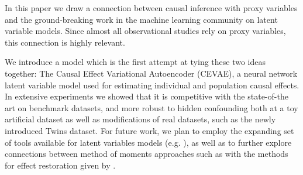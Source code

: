 \vskip -10pt
In this paper we draw a connection between causal inference with proxy variables and the ground-breaking work in the machine learning community on latent variable models. Since almost all observational studies rely on proxy variables, this connection is highly relevant.

We introduce a model which is the first attempt at tying these two ideas together: The Causal Effect Variational Autoencoder (CEVAE), a neural network latent variable model used for estimating individual and population causal effects. In extensive experiments we showed that it is competitive with the state-of-the art on benchmark datasets, and more robust to hidden confounding both at a toy artificial dataset as well as modifications of real datasets, such as the newly introduced Twins dataset. 
For future work, we plan to employ the expanding set of tools available for latent variables models (e.g. \citet{kingma2016improving,tran2015variational,maaloe2016auxiliary,ranganath2016operator}), as well as to further explore connections between method of moments approaches such as \citet{anandkumar2014tensor} with the methods for effect restoration given by \citet{kuroki2014measurement,miao2016identifying}. 

